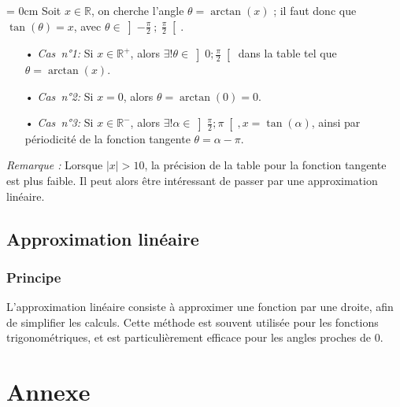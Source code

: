 \documentclass[a4paper]{article}
\begin{document}
					\vspace{2 mm}

					{\parindent = 0cm Soit $x \in \mathbb{R}$, on cherche l'angle $\theta = \arctan(x)$ ; il faut donc que $\tan(\theta) = x$, 
					avec $\theta \in \left]-\frac{\pi}{2}~;~\frac{\pi}{2}\right[$.}

					\vspace{2 mm}

					\begin{itemize}
						\item [•] \emph{Cas~n°1:} Si $x \in \mathbb{R}^+$, alors $\exists! \theta \in \left]0;\frac{\pi}{2}\right[$ dans la table tel que $\theta = \arctan(x)$.
						\vspace{2 mm}
						\item [•] \emph{Cas~n°2:} Si $x = 0$, alors $\theta = \arctan(0) = 0$.
						\vspace{2 mm}
						\item [•] \emph{Cas~n°3:} Si $x \in \mathbb{R}^-$, alors $\exists! \alpha \in \left]\frac{\pi}{2};\pi\right[, x = \tan(\alpha)$, ainsi par périodicité de la fonction tangente $\theta = \alpha - \pi$.
					\end{itemize}

					\vspace{2 mm}

					\emph{Remarque :} Lorsque $|x| > 10$, la précision de la table pour la fonction tangente est plus faible. 
					Il peut alors être intéressant de passer par une approximation linéaire.
		
		\subsection{Approximation linéaire}

			\subsubsection{Principe}

				L'approximation linéaire consiste à approximer une fonction par une droite, 
				afin de simplifier les calculs. Cette méthode est souvent utilisée pour les fonctions trigonométriques,
				et est particulièrement efficace pour les angles proches de $0$.

\newpage

	\section{Annexe}
\end{document}
